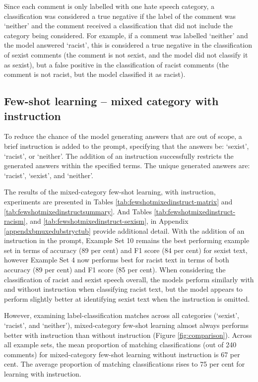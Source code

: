 \documentclass{bmcart}
\begin{document}
Since each comment is only labelled with one hate speech category, a classification was considered a true negative if the label of the comment was `neither' and the comment received a classification that did not include the category being considered. For example, if a comment was labelled `neither' and the model answered `racist', this is considered a true negative in the classification of sexist comments (the comment is not sexist, and the model did not classify it as sexist), but a false positive in the classification of racist comments (the comment is not racist, but the model classified it as racist).


\subsection{Few-shot learning -- mixed category with instruction}\label{few-shot-learning-mixed-category-with-instruction}

To reduce the chance of the model generating answers that are out of scope, a brief instruction is added to the prompt, specifying that the answers be: `sexist', `racist', or `neither'. The addition of an instruction successfully restricts the generated answers within the specified terms. The unique generated answers are: `racist', `sexist', and `neither'.

The results of the mixed-category few-shot learning, with instruction, experiments are presented in Tables \ref{tab:fewshotmixedinstruct-matrix} and \ref{tab:fewshotmixedinstructsummary}. And Tables \ref{tab:fewshotmixedinstruct-racism}, and \ref{tab:fewshotmixedinstruct-sexism}, in Appendix \ref{appendxbmuxedubstryctub} provide additional detail. With the addition of an instruction in the prompt, Example Set 10 remains the best performing example set in terms of accuracy (89 per cent) and F1 score (84 per cent) for sexist text, however Example Set 4 now performs best for racist text in terms of both accuracy (89 per cent) and F1 score (85 per cent). When considering the classification of racist and sexist speech overall, the models perform similarly with and without instruction when classifying racist text, but the model appears to perform slightly better at identifying sexist text when the instruction is omitted.

However, examining label-classification matches across all categories (`sexist', `racist', and `neither'), mixed-category few-shot learning almost always performs better with instruction than without instruction (Figure \ref{fig:comparison}). Across all example sets, the mean proportion of matching classifications (out of 240 comments) for mixed-category few-shot learning without instruction is 67 per cent. The average proportion of matching classifications rises to 75 per cent for learning with instruction.
\end{document}
